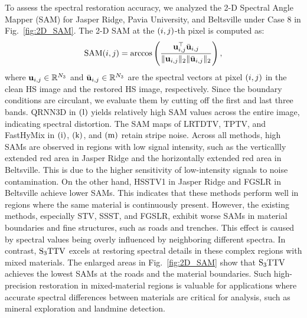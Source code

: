 To assess the spectral restoration accuracy, we analyzed the 2-D Spectral Angle Mapper (SAM) for Jasper Ridge, Pavia University, and Beltsville under Case 8 in Fig.~\ref{fig:2D_SAM}.
The 2-D SAM at the $(i, j)$-th pixel is computed as:
\begin{equation}
	\label{eq:2D_SAM}
	\mathrm{SAM} (i, j) = \arccos \left( \frac{\mathbf{u}_{i, j}^{\top} \bar{{\mathbf{u}}}_{i, j}}{\|\mathbf{u}_{i, j} \|_{2} \|\bar{{\mathbf{u}}}_{i, j} \|_{2}} \right),
\end{equation}
where $\mathbf{u}_{i, j} \in \mathbb{R}^{N_{3}}$ and $\bar{{\mathbf{u}}}_{i, j} \in \mathbb{R}^{N_{3}}$ are the spectral vectors at pixel $(i, j)$ in the clean HS image and the restored HS image, respectively. Since the boundary conditions are circulant, we evaluate them by cutting off the first and last three bands.
QRNN3D in $\text{(l)}$ yields relatively high SAM values across the entire image, indicating spectral distortion.
The SAM maps of LRTDTV, TPTV, and FastHyMix in $\text{(i)}$, $\text{(k)}$, and $\text{(m)}$ retain stripe noise.
Across all methods, high SAMs are observed in regions with low signal intensity, such as the verticallly extended red area in Jasper Ridge and the horizontally extended red area in Beltsville. This is due to the higher sensitivity of low-intensity signals to noise contamination. On the other hand, HSSTV1 in Jasper Ridge and FGSLR in Beltsville achieve lower SAMs. This indicates that these methods perform well in regions where the same material is continuously present.
However, the existing methods, especially STV, SSST, and FGSLR, exhibit worse SAMs in material boundaries and fine structures, such as roads and trenches. This effect is caused by spectral values being overly influenced by neighboring different spectra.
In contrast, ${\text{S}_{3} \text{TTV}}$ excels at restoring spectral details in these complex regions with mixed materials. The enlarged areas in Fig.~\ref{fig:2D_SAM} show that ${\text{S}_{3} \text{TTV}}$ achieves the lowest SAMs at the roads and the material boundaries.
Such high-precision restoration in mixed-material regions is valuable for applications where accurate spectral differences between materials are critical for analysis, such as mineral exploration and landmine detection.

